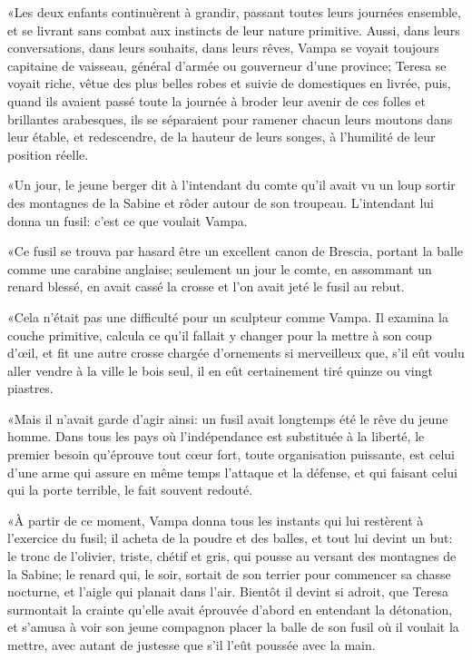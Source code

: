 «Les deux enfants continuèrent à grandir, passant toutes leurs journées ensemble, et se livrant sans combat aux instincts de leur nature primitive. Aussi, dans leurs conversations, dans leurs souhaits, dans leurs rêves, Vampa se voyait toujours capitaine de vaisseau, général d'armée ou gouverneur d'une province; Teresa se voyait riche, vêtue des plus belles robes et suivie de domestiques en livrée, puis, quand ils avaient passé toute la journée à broder leur avenir de ces folles et brillantes arabesques, ils se séparaient pour ramener chacun leurs moutons dans leur étable, et redescendre, de la hauteur de leurs songes, à l'humilité de leur position réelle. 

«Un jour, le jeune berger dit à l'intendant du comte qu'il avait vu un loup sortir des montagnes de la Sabine et rôder autour de son troupeau. L'intendant lui donna un fusil: c'est ce que voulait Vampa. 

«Ce fusil se trouva par hasard être un excellent canon de Brescia, portant la balle comme une carabine anglaise; seulement un jour le comte, en assommant un renard blessé, en avait cassé la crosse et l'on avait jeté le fusil au rebut. 

«Cela n'était pas une difficulté pour un sculpteur comme Vampa. Il examina la couche primitive, calcula ce qu'il fallait y changer pour la mettre à son coup d'œil, et fit une autre crosse chargée d'ornements si merveilleux que, s'il eût voulu aller vendre à la ville le bois seul, il en eût certainement tiré quinze ou vingt piastres. 

«Mais il n'avait garde d'agir ainsi: un fusil avait longtemps été le rêve du jeune homme. Dans tous les pays où l'indépendance est substituée à la liberté, le premier besoin qu'éprouve tout cœur fort, toute organisation puissante, est celui d'une arme qui assure en même temps l'attaque et la défense, et qui faisant celui qui la porte terrible, le fait souvent redouté. 

«À partir de ce moment, Vampa donna tous les instants qui lui restèrent à l'exercice du fusil; il acheta de la poudre et des balles, et tout lui devint un but: le tronc de l'olivier, triste, chétif et gris, qui pousse au versant des montagnes de la Sabine; le renard qui, le soir, sortait de son terrier pour commencer sa chasse nocturne, et l'aigle qui planait dans l'air. Bientôt il devint si adroit, que Teresa surmontait la crainte qu'elle avait éprouvée d'abord en entendant la détonation, et s'amusa à voir son jeune compagnon placer la balle de son fusil où il voulait la mettre, avec autant de justesse que s'il l'eût poussée avec la main. 

